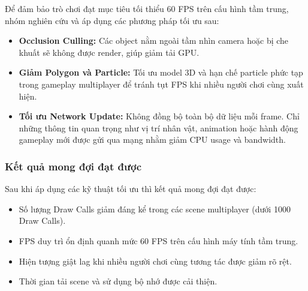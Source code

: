Để đảm bảo trò chơi đạt mục tiêu tối thiểu 60 FPS trên cấu hình tầm trung, nhóm nghiên cứu và áp dụng các phương pháp tối ưu sau:

\begin{itemize}
    \item \textbf{Occlusion Culling:}
    Các object nằm ngoài tầm nhìn camera hoặc bị che khuất sẽ không được render, giúp giảm tải GPU.

    \item \textbf{Giảm Polygon và Particle:}
    Tối ưu model 3D và hạn chế particle phức tạp trong gameplay multiplayer để tránh tụt FPS khi nhiều người chơi cùng xuất hiện.

    \item \textbf{Tối ưu Network Update:}
    Không đồng bộ toàn bộ dữ liệu mỗi frame. Chỉ những thông tin quan trọng như vị trí nhân vật, animation hoặc hành động gameplay mới được gửi qua mạng nhằm giảm CPU usage và bandwidth.

\end{itemize}

\subsubsection{Kết quả mong đợi đạt được}

Sau khi áp dụng các kỹ thuật tối ưu thì kết quả mong đợi đạt được:
\begin{itemize}
    \item Số lượng Draw Calls giảm đáng kể trong các scene multiplayer (dưới 1000 Draw Calls).
    \item FPS duy trì ổn định quanh mức 60 FPS trên cấu hình máy tính tầm trung.
    \item Hiện tượng giật lag khi nhiều người chơi cùng tương tác được giảm rõ rệt.
    \item Thời gian tải scene và sử dụng bộ nhớ được cải thiện.
\end{itemize}